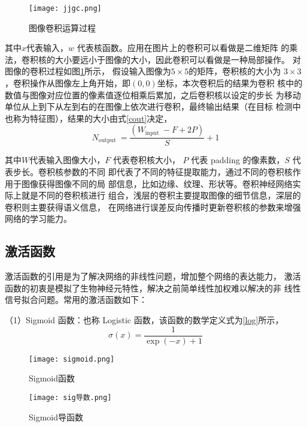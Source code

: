 \begin{figure}[htbp]
    \centering
    \texttt{[image: jjgc.png]}
    \caption{图像卷积运算过程}
    \label{jjgc}
\end{figure}

其中$x$代表输入，$w$ 代表核函数。应用在图片上的卷积可以看做是二维矩阵
的乘法，卷积核的大小要远小于图像的大小，因此卷积可以看做是一种局部操作。
对图像的卷积过程如图\ref{jjgc}所示，
假设输入图像为$5\times5$的矩阵，卷积核的大小为
$3\times3$，卷积操作从图像左上角开始，即$(0,0)$坐标，本次卷积后的结果为卷积
核中的数值与图像对应位置的像素值逐位相乘后累加，之后卷积核以设定的步长
为移动单位从上到下从左到右的在图像上依次进行卷积，最终输出结果（在目标
检测中也称为特征图），结果的大小由式\ref{cout}决定，
\begin{equation}
    N_{\text {output }}=\frac{\left(W_{\text {input }}-F+2 P\right)}{S}+1
    \label{cout}
\end{equation}

其中$W$代表输入图像大小，$F$ 代表卷积核大小， $P$ 代表 padding 的像素数，$S$ 代表步长。卷积核参数的不同
即代表了不同的特征提取能力，通过不同的卷积核作用于图像获得图像不同的局
部信息，比如边缘、纹理、形状等。卷积神经网络实际上就是不同的卷积核进行
组合，浅层的卷积主要提取图像的细节信息，深层的卷积则主要获得语义信息，
在网络进行误差反向传播时更新卷积核的参数来增强网络的学习能力。

\subsection{激活函数}
激活函数的引用是为了解决网络的非线性问题，增加整个网络的表达能力，
激活函数的初衷是模拟了生物神经元特性，解决之前简单线性加权难以解决的非
线性信号拟合问题。常用的激活函数如下：

（1）Sigmoid 函数：也称 Logistic 函数，该函数的数学定义式为\ref{log}所示，
\begin{equation}
    \sigma(x)=\frac{1}{\exp (-x)+1}
    \label{log}
\end{equation}

\begin{figure}[htbp]
    \centering
    \texttt{[image: sigmoid.png]}
    \caption{Sigmoid函数}
    \label{sig}
\end{figure}

\begin{figure}[htbp]
    \centering
    \texttt{[image: sig导数.png]}
    \caption{Sigmoid导函数}
    \label{sigd}
\end{figure}

